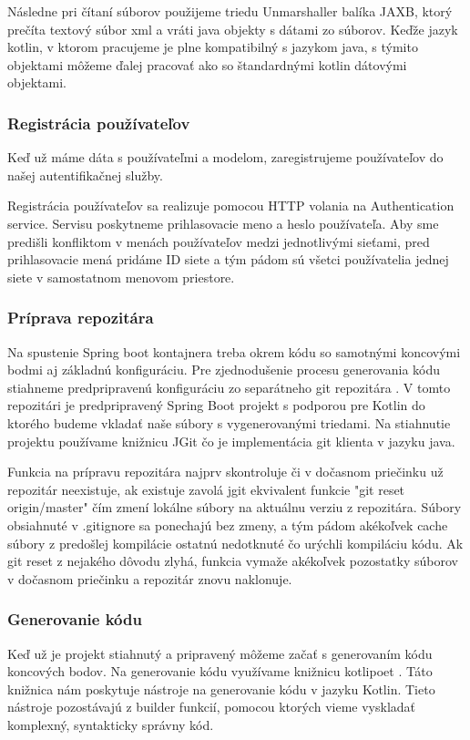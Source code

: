 Následne pri čítaní súborov použijeme triedu Unmarshaller balíka JAXB, ktorý prečíta textový súbor \acrshort{xml} a vráti java objekty s dátami zo súborov. Keďže jazyk kotlin, v ktorom pracujeme je plne kompatibilný s jazykom java, s týmito objektami môžeme ďalej pracovať ako so štandardnými kotlin dátovými objektami. 



\subsubsection{Registrácia používateľov} 
Keď už máme dáta s používateľmi a modelom, zaregistrujeme používateľov do našej autentifikačnej služby. 

Registrácia používateľov sa realizuje pomocou HTTP volania na Authentication service. Servisu poskytneme prihlasovacie meno a heslo používateľa. Aby sme predišli konfliktom v menách používateľov medzi jednotlivými sieťami, pred prihlasovacie mená pridáme ID siete a tým pádom sú všetci používatelia jednej siete v samostatnom menovom priestore. 


\subsubsection{Príprava repozitára} 
Na spustenie Spring boot kontajnera treba okrem kódu so samotnými koncovými bodmi aj základnú konfiguráciu. Pre zjednodušenie procesu generovania kódu stiahneme predpripravenú konfiguráciu zo separátneho git repozitára \cite{dp_relay}. V tomto repozitári je predpripravený Spring Boot projekt s podporou pre Kotlin do ktorého budeme vkladať naše súbory s vygenerovanými triedami. Na stiahnutie projektu používame knižnicu JGit \cite{jgit} čo je implementácia git klienta v jazyku java. 


Funkcia na prípravu repozitára najprv skontroluje či v dočasnom priečinku už repozitár neexistuje, ak existuje zavolá jgit ekvivalent funkcie "git reset origin/master" čím zmení lokálne súbory na aktuálnu verziu z repozitára. Súbory obsiahnuté v .gitignore sa ponechajú bez zmeny, a tým pádom akékoľvek cache súbory z predošlej kompilácie ostatnú nedotknuté čo urýchli kompiláciu kódu. Ak git reset z nejakého dôvodu zlyhá, funkcia vymaže akékoľvek pozostatky súborov v dočasnom priečinku a repozitár znovu naklonuje. 


\subsubsection{Generovanie kódu} 
Keď už je projekt stiahnutý a pripravený môžeme začať s generovaním kódu koncových bodov. Na generovanie kódu  využívame knižnicu kotlipoet \cite{kotlipoet}. Táto knižnica nám poskytuje nástroje na generovanie kódu v jazyku Kotlin. Tieto nástroje pozostávajú z builder funkcií, pomocou ktorých vieme vyskladať komplexný, syntakticky správny kód. 

